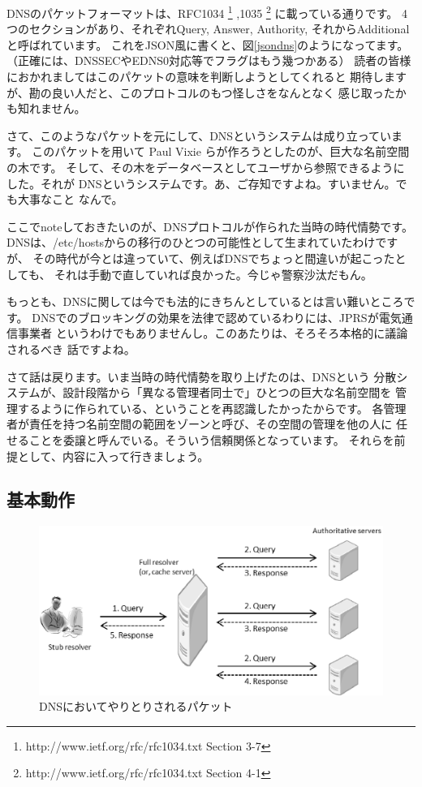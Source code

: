 DNSのパケットフォーマットは、RFC1034
\footnote{http://www.ietf.org/rfc/rfc1034.txt Section 3-7}
,1035 
\footnote{http://www.ietf.org/rfc/rfc1034.txt Section 4-1}
に載っている通りです。
4つのセクションがあり、それぞれQuery, Answer, Authority,
それからAdditionalと呼ばれています。
これをJSON風に書くと、図\ref{jsondns}のようになってます。
（正確には、DNSSECやEDNS0対応等でフラグはもう幾つかある）
読者の皆様におかれましてはこのパケットの意味を判断しようとしてくれると
期待しますが、勘の良い人だと、このプロトコルのもつ怪しさをなんとなく
感じ取ったかも知れません。

さて、このようなパケットを元にして、DNSというシステムは成り立っています。
このパケットを用いて Paul Vixie らが作ろうとしたのが、巨大な名前空間の木です。
そして、その木をデータベースとしてユーザから参照できるようにした。それが
DNSというシステムです。あ、ご存知ですよね。すいません。でも大事なこと
なんで。

ここでnoteしておきたいのが、DNSプロトコルが作られた当時の時代情勢です。
DNSは、/etc/hostsからの移行のひとつの可能性として生まれていたわけですが、
その時代が今とは違っていて、例えばDNSでちょっと間違いが起こったとしても、
それは手動で直していれば良かった。今じゃ警察沙汰だもん。

もっとも、DNSに関しては今でも法的にきちんとしているとは言い難いところです。
DNSでのブロッキングの効果を法律で認めているわりには、JPRSが電気通信事業者
というわけでもありませんし。このあたりは、そろそろ本格的に議論されるべき
話ですよね。

さて話は戻ります。いま当時の時代情勢を取り上げたのは、DNSという
分散システムが、設計段階から「異なる管理者同士で」ひとつの巨大な名前空間を
管理するように作られている、ということを再認識したかったからです。
各管理者が責任を持つ名前空間の範囲をゾーンと呼び、その空間の管理を他の人に
任せることを委譲と呼んでいる。そういう信頼関係となっています。
それらを前提として、内容に入って行きましょう。


\subsection { 基本動作 }

\begin{figure}[b]
\centering
\includegraphics[width=\textwidth]{./suu-g/zuuu.eps}
\caption{DNSにおいてやりとりされるパケット}
\label{packet}
\end{figure}

